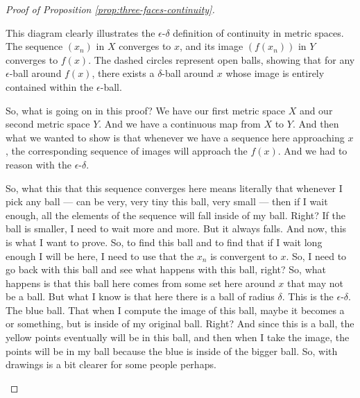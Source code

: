 \begin{proof}[Proof of Proposition \ref{prop:three-faces-continuity}]
\begin{math-stroke}
\begin{center}
\end{center}
\begin{explanation-of-steps}
This diagram clearly illustrates the $\epsilon$-$\delta$ definition of continuity in metric spaces. The sequence $(x_n)$ in $X$ converges to $x$, and its image $(f(x_n))$ in $Y$ converges to $f(x)$. The dashed circles represent open balls, showing that for any $\epsilon$-ball around $f(x)$, there exists a $\delta$-ball around $x$ whose image is entirely contained within the $\epsilon$-ball.
\end{explanation-of-steps}
\end{math-stroke}

\begin{spoken-clean}[00:22:32 - 00:24:26]
So, what is going on in this proof? We have our first metric space $X$ and our second metric space $Y$. And we have a continuous map from $X$ to $Y$. And then what we wanted to show is that whenever we have a sequence here approaching $x$, the corresponding sequence of images will approach the $f(x)$. And we had to reason with the $\epsilon$-$\delta$. 

So, what this that this sequence converges here means literally that whenever I pick any ball --- can be very, very tiny this ball, very small --- then if I wait enough, all the elements of the sequence will fall inside of my ball. Right? If the ball is smaller, I need to wait more and more. But it always falls. And now, this is what I want to prove. So, to find this ball and to find that if I wait long enough I will be here, I need to use that the $x_n$ is convergent to $x$. So, I need to go back with this ball and see what happens with this ball, right? So, what happens is that this ball here comes from some set here around $x$ that may not be a ball. But what I know is that here there is a ball of radius $\delta$. This is the $\epsilon$-$\delta$. The blue ball. That when I compute the image of this ball, maybe it becomes a  or something, but is inside of my original ball. Right? And since this is a ball, the yellow points eventually will be in this ball, and then when I take the image, the points will be in my ball because the blue is inside of the bigger ball. So, with drawings is a bit clearer for some people perhaps.
\end{spoken-clean}


\end{proof}
